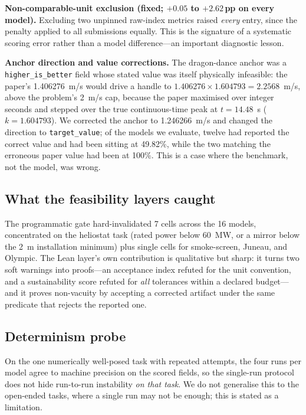 \textbf{Non-comparable-unit exclusion (fixed; $+0.05$ to $+2.62$\,pp on every model).} Excluding two unpinned raw-index metrics raised \emph{every} entry, since the penalty applied to all submissions equally. This is the signature of a systematic scoring error rather than a model difference---an important diagnostic lesson.

\textbf{Anchor direction and value corrections.} The dragon-dance anchor was a \texttt{higher\_is\_better} field whose stated value was itself physically infeasible: the paper's 1.406276~m/s would drive a handle to $1.406276\times1.604793=2.2568$~m/s, above the problem's 2~m/s cap, because the paper maximised over integer seconds and stepped over the true continuous-time peak at $t=14.48$~s ($k=1.604793$). We corrected the anchor to 1.246266~m/s and changed the direction to \texttt{target\_value}; of the models we evaluate, twelve had reported the correct value and had been sitting at 49.82\%, while the two matching the erroneous paper value had been at 100\%. This is a case where the benchmark, not the model, was wrong.

\subsection{What the feasibility layers caught}
The programmatic gate hard-invalidated 7 cells across the 16 models, concentrated on the heliostat task (rated power below 60~MW, or a mirror below the 2~m installation minimum) plus single cells for smoke-screen, Juneau, and Olympic. The Lean layer's own contribution is qualitative but sharp: it turns two soft warnings into proofs---an acceptance index refuted for the unit convention, and a sustainability score refuted for \emph{all} tolerances within a declared budget---and it proves non-vacuity by accepting a corrected artifact under the same predicate that rejects the reported one.

\subsection{Determinism probe}
On the one numerically well-posed task with repeated attempts, the four runs per model agree to machine precision on the scored fields, so the single-run protocol does not hide run-to-run instability \emph{on that task}. We do not generalise this to the open-ended tasks, where a single run may not be enough; this is stated as a limitation.
